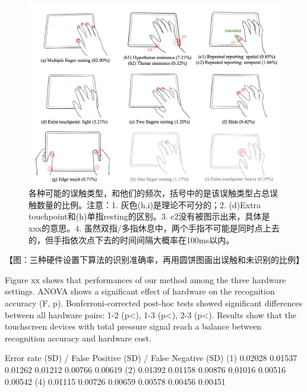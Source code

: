 
\begin{figure}[!tbh]
	\includegraphics[width=1.0\linewidth]{figures/unintentional_touch.png}
	\centering
	\caption{各种可能的误触类型，和他们的频次，括号中的是该误触类型占总误触数量的比例。注意：1. 灰色(h,i)是理论不可分的；2. (d)Extra touchpoint和(h)单指resting的区别。3. c2没有被图示出来，具体是xxx的意思。4. 虽然双指/多指休息中，两个手指不可能是同时点上去的，但手指依次点下去的时间间隔大概率在100ms以内。}
	\label{fig:unintentional_touch}
\end{figure}

【图：三种硬件设置下算法的识别准确率，再用圆饼图画出误触和未识别的比例】

Figure xx shows that performances of our method among the three hardware settings. ANOVA shows a significant effect of hardware on the recognition accuracy (F, p). Bonferroni-corrected post-hoc tests showed significant differences between all hardware pairs: 1-2 (p<), 1-3 (p<), 2-3 (p<). Results show that the touchscreen devices with total pressure signal reach a balance between recognition accuracy and hardware cost.

Error rate (SD) / False Positive (SD) / False Negative (SD)
(1) 0.02028 0.01537 0.01262 0.01212 0.00766 0.00619
(2) 0.01392 0.01158 0.00876 0.01016 0.00516 0.00542
(4) 0.01115 0.00726 0.00659 0.00578 0.00456 0.00451
